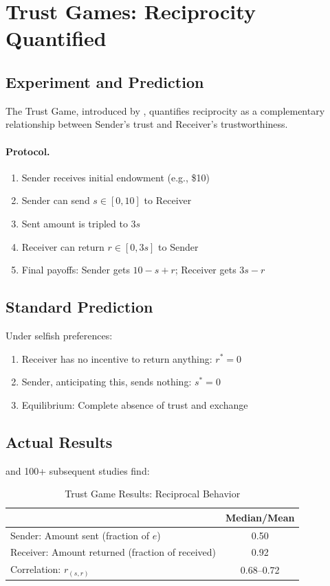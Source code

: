 \documentclass[12pt,oneside]{book}
\begin{document}
\section{Trust Games: Reciprocity Quantified}

\subsection{Experiment and Prediction}

The Trust Game, introduced by \citet{bergsend1995}, quantifies reciprocity as a complementary relationship
between Sender's trust and Receiver's trustworthiness.

\paragraph{Protocol.}
\begin{enumerate}
  \item Sender receives initial endowment (e.g., \$10)
  \item Sender can send $s \in [0, 10]$ to Receiver
  \item Sent amount is tripled to $3s$
  \item Receiver can return $r \in [0, 3s]$ to Sender
  \item Final payoffs: Sender gets $10 - s + r$; Receiver gets $3s - r$
\end{enumerate}

\subsection{Standard Prediction}

Under selfish preferences:
\begin{enumerate}
  \item Receiver has no incentive to return anything: $r^* = 0$
  \item Sender, anticipating this, sends nothing: $s^* = 0$
  \item Equilibrium: Complete absence of trust and exchange
\end{enumerate}

\subsection{Actual Results}

\citet{bergsend1995} and 100+ subsequent studies find:

\begin{table}[htbp]
\centering
\caption{Trust Game Results: Reciprocal Behavior}
\label{tab:trust}
\begin{tabular}{@{}lc@{}}
\toprule
& \textbf{Median/Mean} \\
\midrule
Sender: Amount sent (fraction of $e$) & 0.50 \\
Receiver: Amount returned (fraction of received) & 0.92 \\
Correlation: $r_{(s, r)}$ & 0.68--0.72 \\
\bottomrule
\end{tabular}
\end{table}
\end{document}
